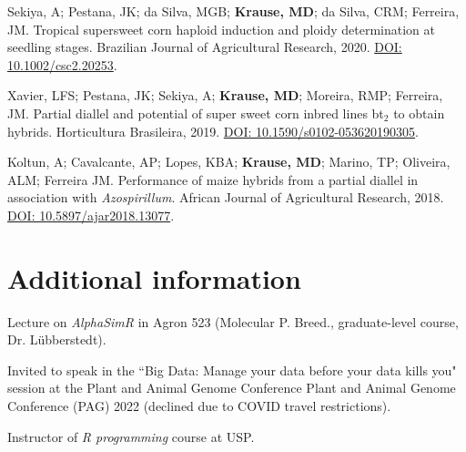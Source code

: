 \documentclass[]{deedy-resume-openfont}
\begin{document}
\begin{minipage}[t]{1\textwidth}
\sectionsep
Sekiya, A; Pestana, JK; da Silva, MGB; \textbf{Krause, MD}; da Silva, CRM; Ferreira, JM. Tropical supersweet corn haploid induction and ploidy determination at seedling stages. Brazilian Journal of Agricultural Research, 2020. \href{https://www.scielo.br/pdf/pab/v55/1678-3921-pab-55-e00968.pdf}{DOI: 10.1002/csc2.20253}. \ExternalLink 

\sectionsep
Xavier, LFS; Pestana, JK; Sekiya, A; \textbf{Krause, MD}; Moreira, RMP; Ferreira, JM. Partial diallel and potential of super sweet corn inbred lines bt$_2$ to obtain hybrids. Horticultura Brasileira, 2019. \href{http://www.scielo.br/scielo.php?script=sci_arttext&pid=S0102-05362019000300278}{DOI: 10.1590/s0102-053620190305}. \ExternalLink 

\sectionsep
Koltun, A; Cavalcante, AP; Lopes, KBA; \textbf{Krause, MD}; Marino, TP; Oliveira, ALM; Ferreira JM. Performance of maize hybrids from a partial diallel in association with \textit{Azospirillum}. African Journal of Agricultural Research, 2018. \href{https://academicjournals.org/journal/AJAR/article-abstract/B4A2A1B57541}{DOI: 10.5897/ajar2018.13077}. \ExternalLink

\sectionsep
{}

\sectionsep


\section{Additional information}

\sectionsep


\begin{tightemize}
	\vspace{3 mm}
	\item {} Lecture on \emph{AlphaSimR} in Agron 523 (Molecular P. Breed., graduate-level course, Dr. Lübberstedt). 
	\item {} Invited to speak in the ``Big Data: Manage your data before your data kills you" session at the Plant and Animal Genome Conference Plant and Animal Genome Conference (PAG) 2022 (declined due to COVID travel restrictions).
	\item {} Instructor of \emph{R programming} course at USP.
\end{tightemize}


\end{minipage}
\end{document}
